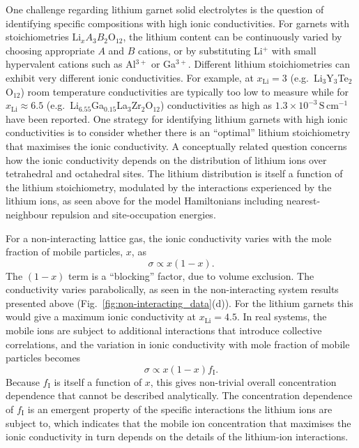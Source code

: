 \documentclass[aps,prb,twocolumn,superscriptaddress,reprint]{revtex4-1}
\newcommand{\xLi}{x_\m{Li}}
\renewcommand{\u}[1]{\,\mathrm{#1}}
\newcommand{\m}[1]{\mathrm{#1}}
\begin{document}
One challenge regarding lithium garnet solid electrolytes is the question of identifying specific compositions with high ionic conductivities. For garnets with stoichiometries $\m{Li}_xA_3B_2\m{O}_{12}$, the lithium content can be continuously varied by choosing appropriate $A$ and $B$ cations, or by substituting Li$^+$ with small hypervalent cations such as Al$^{3+}$ or Ga$^{3+}$. Different lithium stoichiometries can exhibit very different ionic conductivities. For example, at $\xLi=3$ (e.g.\ Li$_3$Y$_3$Te$_2$O$_{12}$) room temperature conductivities are typically too low to measure\cite{OCallaghanEtAl_ChemMater2006,BachmanEtAl_ChemRev2016,ThangaduraiEtAl_JPhysChemLett2015} 
while for $\xLi\approx6.5$ (e.g.\ Li$_{6.55}$Ga$_{0.15}$La$_3$Zr$_2$O$_{12}$) conductivities as high as $1.3\times10^{-3}\u{S}\u{cm}^{-1}$ have been reported.\cite{Bernuy-LopezEtAl_ChemMater2014,RettenwanderEtAl_InorgChem2014} One strategy for identifying lithium garnets with high ionic conductivities is to consider whether there is an ``optimal'' lithium stoichiometry that maximises the ionic conductivity.\cite{MuruganEtAl_JElectrochemSoc2008,MuruganEtAl_Ionics2007,RamakumarEtAl_DaltonTrans2015,MiaraEtAl_ChemMater2013,XieEtAl_ChemMater2011,MuruganEtAl_MaterSciEngB2007,OCallaghanAndCussen_ChemComm2007,XuEtAl_PhysRevB2012,ChenEtAl_SciRep2017} A conceptually related question concerns how the ionic conductivity depends on the distribution of lithium ions over tetrahedral and octahedral sites.\cite{ChenEtAl_ChemMater2015,ThangaduraiEtAl_JAmCeramSoc2003,MuruganEtAl_MaterSciEngB2007,OCallaghanAndCussen_ChemComm2007} The lithium distribution is itself a function of the lithium stoichiometry, modulated by the interactions experienced by the lithium ions, as seen above for the model Hamiltonians including nearest-neighbour repulsion and site-occupation energies.
 
For a non-interacting lattice gas, the ionic conductivity varies with the mole fraction of mobile particles, $x$, as
\begin{equation}
  \sigma \propto x \left(1-x\right).
\end{equation}
The $(1-x)$ term is a ``blocking'' factor, due to volume exclusion.\cite{Kutner_PhysLett1981} The conductivity varies parabolically, as seen in the non-interacting system results presented above (Fig.\ \ref{fig:non-interacting_data}(d)). For the lithium garnets this would give a maximum ionic conductivity at $\xLi=4.5$. In real systems, the mobile ions are subject to additional interactions that introduce collective correlations, and the variation in ionic conductivity with mole fraction of mobile particles becomes
\begin{equation}
  \sigma \propto x \left(1-x\right)f_\m{I}.
  \label{eqn:sigma_conc_dependence}
\end{equation}
Because $f_\m{I}$ is itself a function of $x$, this gives non-trivial overall concentration dependence that cannot be described analytically. The concentration dependence of $f_\m{I}$ is an emergent property of the specific interactions the lithium ions are subject to, which indicates that the mobile ion concentration that maximises the ionic conductivity in turn depends on the details of the lithium-ion interactions. 
\end{document}
